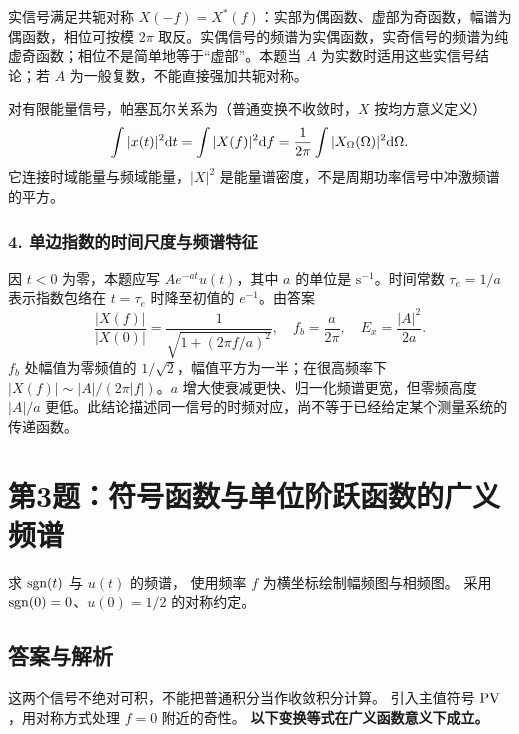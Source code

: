 实信号满足共轭对称 $X(-f)=X^*(f)$：实部为偶函数、虚部为奇函数，幅谱为偶函数，相位可按模 $2\pi$ 取反。实偶信号的频谱为实偶函数，实奇信号的频谱为纯虚奇函数；相位不是简单地等于“虚部”。本题当 $A$ 为实数时适用这些实信号结论；若 $A$ 为一般复数，不能直接强加共轭对称。

对有限能量信号，帕塞瓦尔关系为（普通变换不收敛时，$X$ 按均方意义定义）
\[
\int|x(t)|^2\mathrm{d} t=\int|X(f)|^2\mathrm{d} f
=\frac1{2\pi}\int|X_\Omega(\Omega)|^2\mathrm{d}\Omega.
\]
它连接时域能量与频域能量，$|X|^2$ 是能量谱密度，不是周期功率信号中冲激频谱的平方。

\subsubsection*{4. 单边指数的时间尺度与频谱特征}
因 $t<0$ 为零，本题应写 $Ae^{-at}u(t)$，其中 $a$ 的单位是 $\mathrm{s^{-1}}$。时间常数 $\tau_e=1/a$ 表示指数包络在 $t=\tau_e$ 时降至初值的 $e^{-1}$。由答案
\[
\frac{|X(f)|}{|X(0)|}=\frac1{\sqrt{1+(2\pi f/a)^2}},\quad
f_b=\frac a{2\pi},\quad E_x=\frac{|A|^2}{2a}.
\]
$f_b$ 处幅值为零频值的 $1/\sqrt2$，幅值平方为一半；在很高频率下 $|X(f)|\sim|A|/(2\pi|f|)$。$a$ 增大使衰减更快、归一化频谱更宽，但零频高度 $|A|/a$ 更低。此结论描述同一信号的时频对应，尚不等于已经给定某个测量系统的传递函数。



\section{第3题：符号函数与单位阶跃函数的广义频谱}
\label{hw:2-3}

\begin{hwquestion}
求 $\operatorname{sgn}(t)$ 与 $u(t)$ 的频谱，
    使用频率 $f$ 为横坐标绘制幅频图与相频图。
    采用 $\operatorname{sgn}(0)=0$、$u(0)=1/2$ 的对称约定。
\end{hwquestion}

\subsection*{答案与解析}
这两个信号不绝对可积，不能把普通积分当作收敛积分计算。
引入主值符号 $\operatorname{PV}$，用对称方式处理 $f=0$ 附近的奇性。
\textbf{以下变换等式在广义函数意义下成立。}

